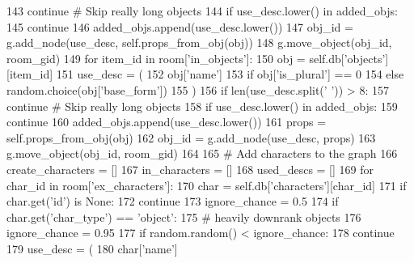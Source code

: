 \begin{DoxyCode}
143                 \textcolor{keywordflow}{continue}  \textcolor{comment}{# Skip really long objects}
144             \textcolor{keywordflow}{if} use\_desc.lower() \textcolor{keywordflow}{in} added\_objs:
145                 \textcolor{keywordflow}{continue}
146             added\_objs.append(use\_desc.lower())
147             obj\_id = g.add\_node(use\_desc, self.props\_from\_obj(obj))
148             g.move\_object(obj\_id, room\_gid)
149         \textcolor{keywordflow}{for} item\_id \textcolor{keywordflow}{in} room[\textcolor{stringliteral}{'in\_objects'}]:
150             obj = self.db[\textcolor{stringliteral}{'objects'}][item\_id]
151             use\_desc = (
152                 obj[\textcolor{stringliteral}{'name'}]
153                 \textcolor{keywordflow}{if} obj[\textcolor{stringliteral}{'is\_plural'}] == 0
154                 \textcolor{keywordflow}{else} random.choice(obj[\textcolor{stringliteral}{'base\_form'}])
155             )
156             \textcolor{keywordflow}{if} len(use\_desc.split(\textcolor{stringliteral}{' '})) > 8:
157                 \textcolor{keywordflow}{continue}  \textcolor{comment}{# Skip really long objects}
158             \textcolor{keywordflow}{if} use\_desc.lower() \textcolor{keywordflow}{in} added\_objs:
159                 \textcolor{keywordflow}{continue}
160             added\_objs.append(use\_desc.lower())
161             props = self.props\_from\_obj(obj)
162             obj\_id = g.add\_node(use\_desc, props)
163             g.move\_object(obj\_id, room\_gid)
164 
165         \textcolor{comment}{# Add characters to the graph}
166         create\_characters = []
167         in\_characters = []
168         used\_descs = []
169         \textcolor{keywordflow}{for} char\_id \textcolor{keywordflow}{in} room[\textcolor{stringliteral}{'ex\_characters'}]:
170             char = self.db[\textcolor{stringliteral}{'characters'}][char\_id]
171             \textcolor{keywordflow}{if} char.get(\textcolor{stringliteral}{'id'}) \textcolor{keywordflow}{is} \textcolor{keywordtype}{None}:
172                 \textcolor{keywordflow}{continue}
173             ignore\_chance = 0.5
174             \textcolor{keywordflow}{if} char.get(\textcolor{stringliteral}{'char\_type'}) == \textcolor{stringliteral}{'object'}:
175                 \textcolor{comment}{# heavily downrank objects}
176                 ignore\_chance = 0.95
177             \textcolor{keywordflow}{if} random.random() < ignore\_chance:
178                 \textcolor{keywordflow}{continue}
179             use\_desc = (
180                 char[\textcolor{stringliteral}{'name'}]

\end{DoxyCode}
